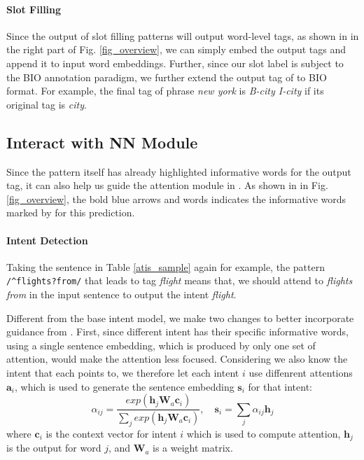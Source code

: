 \paragraph{Slot Filling}
Since the output of slot filling \RE patterns will output word-level tags, as shown in  in the right part of Fig. \ref{fig_overview}, we can simply embed the output tags and append it to input word embeddings. 
Further, since our slot label is subject to the BIO annotation paradigm, we further extend the output tag of \RE to BIO format. For example, the final \RE tag of phrase \emph{new york} is \emph{B-city I-city} if its original tag is \emph{city}.

\subsection{Interact with NN Module}
\label{interact_with_module}
Since the \RE pattern itself has already highlighted informative words for the output tag, it can also help us guide the attention module in \NN.
As shown in  in Fig. \ref{fig_overview}, the bold blue arrows and words indicates the informative words marked by \RE for this prediction.
\paragraph{Intent Detection}
Taking the sentence in Table \ref{atis_sample} again for example, the pattern \texttt{/\textasciicircum flights?\:from/} that leads to tag \emph{flight} means that, we should attend to \emph{flights from} in the input sentence to output the intent \emph{flight}.

Different from the base intent model, we make two changes to better incorporate guidance from \RE.
First, since different intent has their specific informative words, using a single sentence embedding, which is produced by only one set of attention, would make the attention less focused. 
Considering we also know the intent that each \RE points to, we therefore let each intent $i$ use diffenrent attentions $\textbf{a}_i$, which is used to generate the sentence embedding $\textbf{s}_i$ for that intent:
\begin{equation}
\alpha_{ij}=\frac{exp(\textbf{h}_j\textbf{W}_a\textbf{c}_i)}{\sum_{j}{exp(\textbf{h}_j\textbf{W}_a\textbf{c}_i)}}, \quad
\textbf{s}_i = \sum_{j}{\alpha_{ij}\textbf{h}_j}
\label{label_att_eq}
\end{equation}
where $\textbf{c}_i$ is the context vector for intent $i$ which is used to compute attention, $\textbf{h}_j$ is the \BLSTM output for word $j$, and $\textbf{W}_a$ is a weight matrix.

